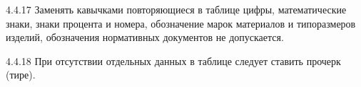4.4.17 Заменять кавычками повторяющиеся в таблице цифры, математические знаки, знаки процента и номера, обозначение марок материалов и типоразмеров изделий, обозначения нормативных документов не допускается.

4.4.18 При отсутствии отдельных данных в таблице следует ставить прочерк (тире).






























